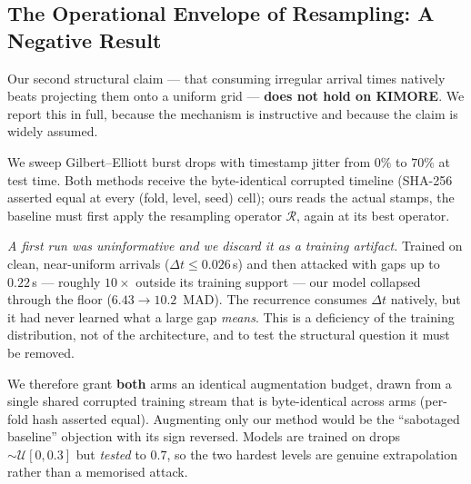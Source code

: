 \subsection{The Operational Envelope of Resampling: A Negative Result}
\label{sec:results:resampling}

Our second structural claim --- that consuming irregular arrival times natively beats projecting
them onto a uniform grid --- \textbf{does not hold on KIMORE}. We report this in full, because the
mechanism is instructive and because the claim is widely assumed.

We sweep Gilbert--Elliott burst drops with timestamp jitter from $0\%$ to $70\%$ at test time. Both
methods receive the byte-identical corrupted timeline (SHA-256 asserted equal at every
(fold, level, seed) cell); ours reads the actual stamps, the baseline must first apply the
resampling operator $\mathcal{R}$, again at its best operator.

\emph{A first run was uninformative and we discard it as a training artifact.} Trained on clean,
near-uniform arrivals ($\Delta t\!\le\!0.026$\,s) and then attacked with gaps up to $0.22$\,s ---
roughly $10\times$ outside its training support --- our model collapsed through the floor
($6.43\!\to\!10.2$~MAD). The recurrence consumes $\Delta t$ natively, but it had never learned what
a large gap \emph{means}. This is a deficiency of the training distribution, not of the
architecture, and to test the structural question it must be removed.

We therefore grant \textbf{both} arms an identical augmentation budget, drawn from a single shared
corrupted training stream that is byte-identical across arms (per-fold hash asserted equal).
Augmenting only our method would be the ``sabotaged baseline'' objection with its sign reversed.
Models are trained on drops $\sim\mathcal{U}[0,0.3]$ but \emph{tested} to $0.7$, so the two hardest
levels are genuine extrapolation rather than a memorised attack.

